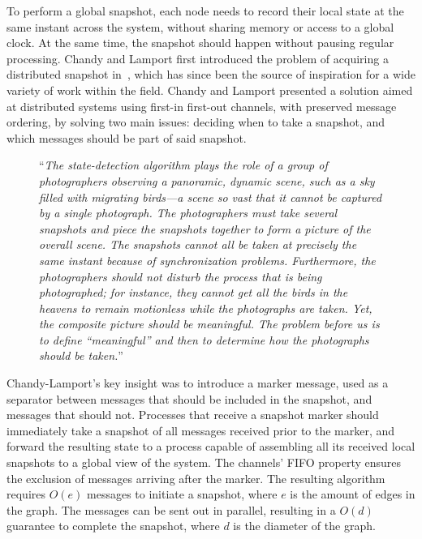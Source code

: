To perform a global snapshot, each node needs to record their local state at the
same instant across the system, without sharing memory or access to a global
clock. At the same time, the snapshot should happen without pausing regular
processing. Chandy and Lamport first introduced the problem of acquiring a
distributed snapshot in~\cite{chandy-lamport}, which has since been the source
of inspiration for a wide variety of work within the field. Chandy and Lamport
presented a solution aimed at distributed systems using first-in first-out
channels, with preserved message ordering, by solving two main issues: deciding
when to take a snapshot, and which messages should be part of said snapshot.

\begin{figure}[H]
  \begin{displayquote}
    ``\textit{The state-detection algorithm plays the role of a group of
      photographers observing a panoramic, dynamic scene, such as a sky filled
      with migrating birds---a scene so vast that it cannot be captured by a
      single photograph. The photographers must take several snapshots and piece
      the snapshots together to form a picture of the overall scene. The snapshots
      cannot all be taken at precisely the same instant because of synchronization
      problems. Furthermore, the photographers should not disturb the process that
      is being photographed; for instance, they cannot get all the birds in the
      heavens to remain motionless while the photographs are taken. Yet, the
      composite picture should be meaningful. The problem before us is to define
    “meaningful” and then to determine how the photographs should be taken.}''
  \end{displayquote}
\end{figure}

Chandy-Lamport's key insight was to introduce a marker message, used as a
separator between messages that should be included in the snapshot, and messages
that should not. Processes that receive a snapshot marker should immediately
take a snapshot of all messages received prior to the marker, and forward the
resulting state to a process capable of assembling all its received local
snapshots to a global view of the system. The channels' FIFO property ensures
the exclusion of messages arriving after the marker. The resulting algorithm
requires $ O(e) $ messages to initiate a snapshot, where $ e $ is the amount of
edges in the graph. The messages can be sent out in parallel, resulting in a $
O(d) $ guarantee to complete the snapshot, where $ d $ is the diameter of the
graph.

